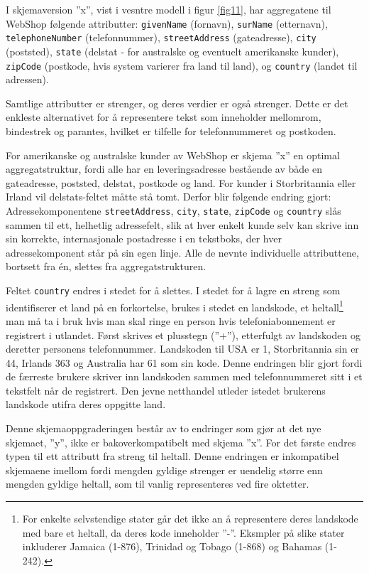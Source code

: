 I skjemaversion ''x'', vist i vesntre modell i figur \ref{fig11}, har aggregatene til WebShop følgende attributter: \texttt{givenName} (fornavn), \texttt{surName} (etternavn), \texttt{telephoneNumber} (telefonnummer), \texttt{streetAddress} (gateadresse), \texttt{city} (poststed), \texttt{state} (delstat - for australske og eventuelt amerikanske kunder), \texttt{zipCode} (postkode, hvis system varierer fra land til land), og \texttt{country} (landet til adressen).

Samtlige attributter er strenger, og deres verdier er også strenger. Dette er det enkleste alternativet for å representere tekst som inneholder mellomrom, bindestrek og parantes, hvilket er tilfelle for telefonnummeret og postkoden.

For amerikanske og australske kunder av WebShop er skjema ''x'' en optimal aggregatstruktur, fordi alle har en leveringsadresse bestående av både en gateadresse, poststed, delstat, postkode og land. For kunder i Storbritannia eller Irland vil delstats-feltet måtte stå tomt. Derfor blir følgende endring gjort: Adressekomponentene \texttt{streetAddress}, \texttt{city}, \texttt{state}, \texttt{zipCode} og \texttt{country} slås sammen til ett, helhetlig adressefelt, slik at hver enkelt kunde selv kan skrive inn sin korrekte, internasjonale postadresse i en tekstboks, der hver adressekomponent står på sin egen linje. Alle de nevnte individuelle attributtene, bortsett fra én, slettes fra aggregatstrukturen.

Feltet \texttt{country} endres i stedet for å slettes. I stedet for å lagre en streng som identifiserer et land på en forkortelse, brukes i stedet en landskode, et heltall\footnote{For enkelte selvstendige stater går det ikke an å representere deres landskode med bare et heltall, da deres kode inneholder ''-''. Eksmpler på slike stater inkluderer Jamaica (1-876), Trinidad og Tobago (1-868) og Bahamas (1-242).} man må ta i bruk hvis man skal ringe en person hvis telefoniabonnement er registrert i utlandet. Først skrives et plusstegn (''+''), etterfulgt av landskoden og deretter personens telefonnummer. Landskoden til USA er 1, Storbritannia sin er 44, Irlands 363 og Australia har 61 som sin kode. Denne endringen blir gjort fordi de færreste brukere skriver inn landskoden sammen med telefonnummeret sitt i et tekstfelt når de registrert. Den jevne netthandel utleder istedet brukerens landskode utifra deres oppgitte land.

Denne skjemaoppgraderingen består av to endringer som gjør at det nye skjemaet, ''y'', ikke er bakoverkompatibelt med skjema ''x''. For det første endres typen til ett attributt fra streng til heltall. Denne endringen er inkompatibel skjemaene imellom fordi mengden gyldige strenger er uendelig større enn mengden gyldige heltall, som til vanlig representeres ved fire oktetter.

